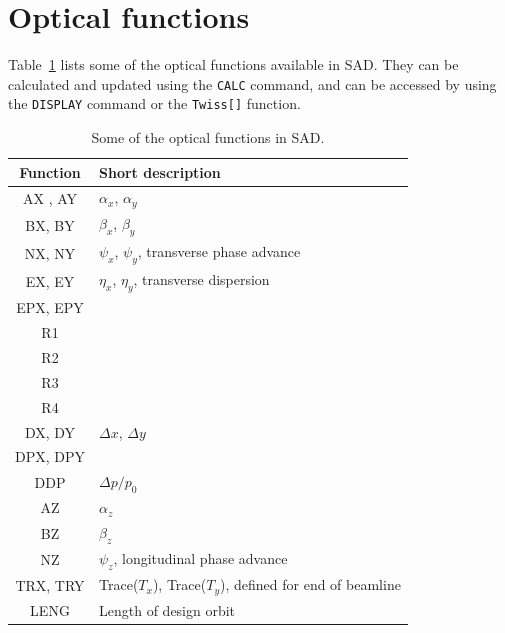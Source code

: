 \documentclass{article}
\begin{document}

\section{Optical functions}
Table~\ref{tab:opticalFunctions} lists some of the optical functions available in SAD. They can be calculated and updated using the \texttt{CALC} command, and can be accessed by using the \texttt{DISPLAY} command or the \texttt{Twiss[]} function.
\begin{table}[h]
	\begin{center}
	\caption{Some of the optical functions in SAD. }
	\label{tab:opticalFunctions}
	\begin{tabular}[c]{cl}
	Function		&	Short description								\\	\hline
	AX , AY		&	$\alpha_x$,  $\alpha_y$			\\
	BX, BY		&	$\beta_x$, $\beta_y$				\\
	NX, NY		&	$\psi_x$, $\psi_y$, transverse phase advance	\\
	EX, EY		&	$\eta_x$, $\eta_y$, transverse dispersion		\\
	EPX, EPY		&								\\
	R1			&								\\
	R2			&								\\
	R3			&								\\
	R4			&								\\
	DX, DY		&	$\Delta x$, $\Delta y$			\\
	DPX,	 DPY		&								\\
	DDP			&	$\Delta p /p_0$					\\
	AZ			&	$\alpha_z$					\\
	BZ			&	$\beta_z$						\\
	NZ			&	$\psi_z$, longitudinal phase advance	\\
	TRX, TRY		&	Trace($T_x$), Trace($T_y$), defined for end of beamline		\\
	LENG		&	Length of design orbit			\\
	\end{tabular}
	\end{center}
\end{table}
\end{document}
